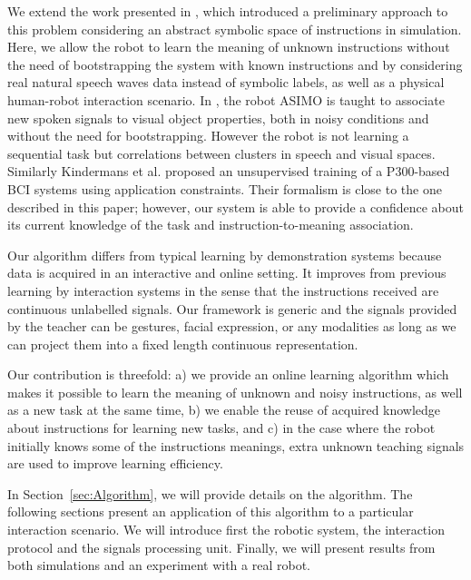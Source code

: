 We extend the work presented in \cite{macl11simul}, which introduced a preliminary approach to this problem considering an abstract symbolic space of instructions in simulation. Here, we allow the robot to learn the meaning of unknown instructions without the need of bootstrapping the system with known instructions and by considering real natural speech waves data instead of symbolic labels, as well as a physical human-robot interaction scenario. In \cite{heckmann2009teaching}, the robot ASIMO is taught to associate new spoken signals to visual object properties, both in noisy conditions and without the need for bootstrapping. However the robot is not learning a sequential task but correlations between clusters in speech and visual spaces. Similarly Kindermans et al. \cite{Kindermans2012a} proposed an unsupervised training of a P300-based BCI systems using application constraints. Their formalism is close to the one described in this paper; however, our system is able to provide a confidence about its current knowledge of the task and instruction-to-meaning association.

Our algorithm differs from typical learning by demonstration systems because data is acquired in an interactive and online setting. It improves from previous learning by interaction systems in the sense that the instructions received are continuous unlabelled signals. Our framework is generic and the signals provided by the teacher can be gestures, facial expression, or any modalities as long as we can project them into a fixed length continuous representation.


Our contribution is threefold: a) we provide an online learning algorithm which makes it possible to learn the meaning of unknown and noisy instructions, as well as a new task at the same time, b) we enable the reuse of acquired knowledge about instructions for learning new tasks, and c) in the case where the robot initially knows some of the instructions meanings, extra unknown teaching signals are used to improve learning efficiency.

In Section~\ref{sec:Algorithm}, we will provide details on the algorithm. %
The following sections present an application of this algorithm to a particular interaction scenario. We will introduce first the robotic system, the interaction protocol and the signals processing unit. Finally, we will present results from both simulations and an experiment with a real robot.


